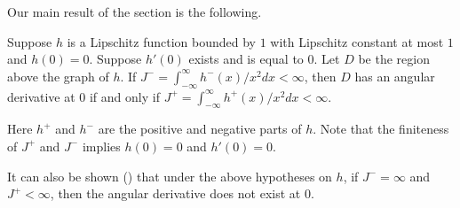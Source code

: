 Our main result of the section is the following.

\begin{theorem}\label{thm:ch5_5.11}
Suppose $h$ is a Lipschitz function bounded by $1$ with Lips\-chitz constant at most $1$ and $h(0) = 0$. Suppose $h'(0)$ exists and is equal to $0$. Let $D$ be the region above the graph of $h$. If $J^- = \int_{-\infty}^\infty h^-(x)/x^2 dx < \infty$, then $D$ has an angular derivative at $0$ if and only if $J^+ = \int_{-\infty}^{\infty} h^+(x)/x^2 dx \allowbreak < \infty$.
\end{theorem}

Here $h^+$ and $h^-$ are the positive and negative parts of $h$. Note that the finiteness of $J^+$ and $J^-$ implies $h(0) = 0$ and $h'(0) = 0$.

It can also be shown (\cite{Burdzy1987}) that under the above hypotheses on $h$, if $J^- = \infty$ and $J^+ < \infty$, then the angular derivative does not exist at $0$.

